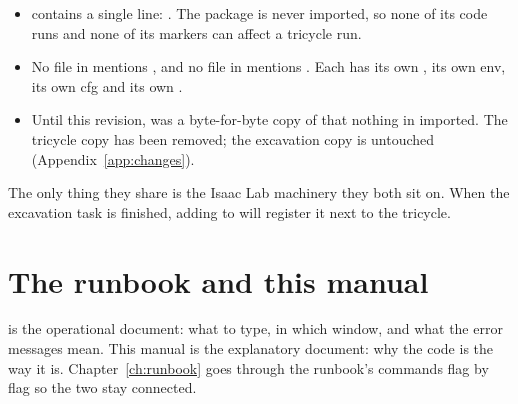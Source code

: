 \begin{itemize}[leftmargin=1.6em]
  \item {} contains a single line:
        . The  package is never
        imported, so none of its code runs and none of its 
        markers can affect a tricycle run.
  \item No file in  mentions , and no file in
         mentions . Each has its own
        , its own env, its own cfg and its own
        .
  \item Until this revision,  was a byte-for-byte copy
        of  that nothing in 
        imported. The tricycle copy has been removed; the excavation copy is
        untouched (Appendix~\ref{app:changes}).
\end{itemize}

The only thing they share is the Isaac Lab machinery they both sit on. When
the excavation task is finished, adding  to
 will register it next to the tricycle.

\section{The runbook and this manual}

 is the operational document: what to type, in which
window, and what the error messages mean. This manual is the explanatory
document: why the code is the way it is. Chapter~\ref{ch:runbook} goes through
the runbook's commands flag by flag so the two stay connected.
